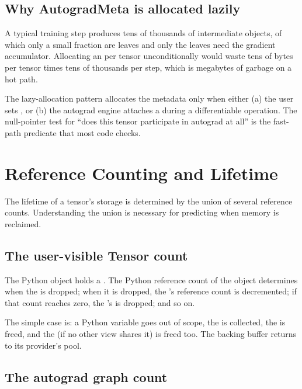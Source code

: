 \subsection{Why AutogradMeta is allocated lazily}
\label{ssec:tensor_model:lazy_alloc}

A typical training step produces tens of thousands of intermediate
 objects, of which only a small fraction are
leaves and only the leaves need the gradient accumulator. Allocating
an  per tensor unconditionally would waste tens
of bytes per tensor times tens of thousands per step, which is
megabytes of garbage on a hot path.

The lazy-allocation pattern allocates the metadata only when
either (a) the user sets , or (b) the
autograd engine attaches a  during a differentiable
operation. The null-pointer test for ``does this tensor participate
in autograd at all'' is the fast-path predicate that most code
checks.

\section{Reference Counting and Lifetime}
\label{sec:tensor_model:refcounts}

The lifetime of a tensor's storage is determined by the union of
several reference counts. Understanding the union is necessary for
predicting when memory is reclaimed.

\subsection{The user-visible Tensor count}
\label{ssec:tensor_model:user_count}

The Python  object holds a .
The Python reference count of the  object determines
when the  is dropped; when it is dropped, the
's reference count is decremented; if that count
reaches zero, the 's  is
dropped; and so on.

The simple case is: a Python variable goes out of scope, the
 is collected, the  is freed, and the
 (if no other view shares it) is freed too. The
backing buffer returns to its provider's pool.

\subsection{The autograd graph count}
\label{ssec:tensor_model:autograd_count}

